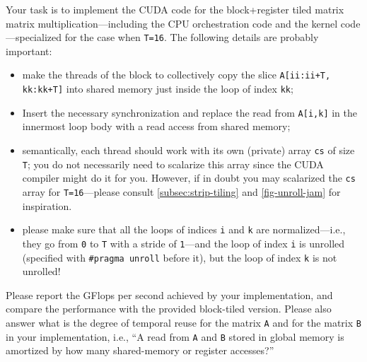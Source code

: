 \documentclass[acmsmall,review]{acmart}\settopmatter{printfolios=true,printccs=false,printacmref=false}
\begin{document}
Your task is to implement the CUDA code for the block+register tiled
matrix matrix multiplication---including the CPU orchestration code 
and the kernel code---specialized for the case when {\tt T=16}. 
The following details are probably important:
\begin{itemize}
    \item make the threads of the block to collectively copy the slice
        {\tt A[ii:ii+T, kk:kk+T]} into shared memory just inside the
        loop of index {\tt kk};
    \item Insert the necessary synchronization
        and replace the read from {\tt A[i,k]} in the innermost loop 
        body with a read access from shared memory;
    \item semantically, each thread should work with its own (private) 
        array {\tt cs} of size {\tt T}; you do not necessarily need
        to scalarize this array since the CUDA compiler might do it
        for you. However, if in doubt you may scalarized the {\tt cs} 
        array for {\tt T=16}---please consult \cref{subsec:strip-tiling} 
        and \cref{fig-unroll-jam} for inspiration.
    \item please make sure that all the loops of indices {\tt i}
        and {\tt k} are normalized---i.e., they go from {\tt 0}
        to {\tt T} with a stride of {\tt 1}---and the loop of index
        {\tt i} is unrolled (specified with {\tt \#pragma unroll} before it),
        but the loop of index {\tt k} is not unrolled! 
\end{itemize}

Please report the GFlops per second achieved by your implementation,
and compare the performance with the provided block-tiled version.
Please also answer what is the degree of temporal reuse for the
matrix {\tt A} and for the matrix {\tt B} in your implementation,
i.e., ``A read from {\tt A} and {\tt B} stored in global memory is 
amortized by how many shared-memory or register accesses?''

\newpage

\end{document}
